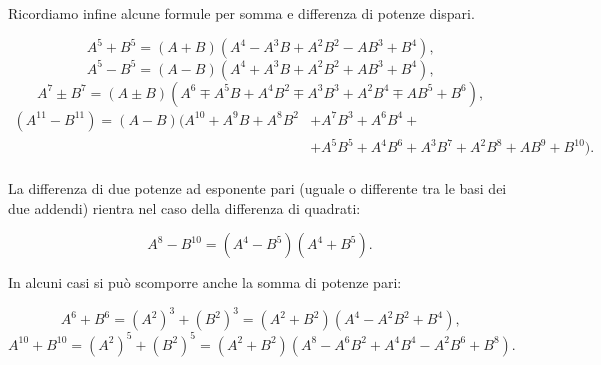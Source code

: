 Ricordiamo infine alcune formule per somma e differenza di potenze
dispari.

\[A^5+B^5=(A+B)\left(A^4-A^3B+A^2B^2-AB^3+B^4\right)\text{,}\]
\[A^5-B^5=(A-B)\left(A^4+A^3B+A^2B^2+AB^3+B^4\right)\text{,}\]
\[A^{7}\pm B^{7}=(A\pm B)\left(A^{6}\mp A^{5}B+A^{4}B^{2}\mp A^{3}B^{3}+A^{2}B^{4}\mp AB^{5}+B^{6}\right)\text{,}\]
\begin{equation*}
\begin{split}
 (A^{11}-B^{11})=(A-B)(A^{10}+A^{9}B+A^{8}B^{2}&+A^{7}B^{3}+A^{6}B^{4}+\\
 &+A^{5}B^{5}+A^{4}B^{6}+A^{3}B^{7}+A^{2}B^{8}+AB^{9}+B^{10}).\\
\end{split}
\end{equation*}

La differenza di due potenze ad esponente pari (uguale o differente tra le basi dei due addendi)
rientra nel caso della differenza di quadrati:

\[A^{8}-B^{10}=\left(A^{4}-B^{5}\right)\left(A^{4}+B^{5}\right).\]

In alcuni casi si può scomporre anche la somma di potenze pari:

\[A^{6}+B^{6}=\left(A^{2}\right)^{3}+\left(B^{2}\right)^{3}=\left(A^{2}+B^{2}\right)\left(A^{4}-A^{2}B^{2}+B^{4}\right)\text{,}\]
\[A^{10}+B^{10}=\left(A^{2}\right)^{5}+\left(B^{2}\right)^{5}=\left(A^{2}+B^{2}\right)\left(A^{8}-A^{6}B^{2}+A^{4}B^{4}-A^2B^6+B^8\right).\]

